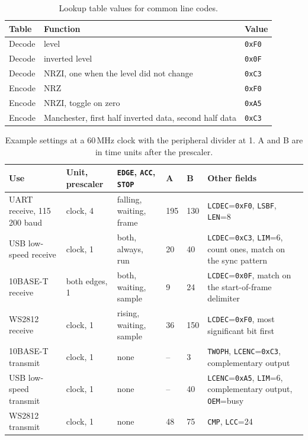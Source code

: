 \documentclass[10pt,a4paper]{article}
\newcommand{\reg}[1]{\texttt{#1}}
\begin{document}
\begin{table}[H]
\centering\small
\begin{tabular}{@{}lll@{}}
\toprule
Table & Function & Value \\
\midrule
Decode & level & \texttt{0xF0} \\
Decode & inverted level & \texttt{0x0F} \\
Decode & NRZI, one when the level did not change & \texttt{0xC3} \\
Encode & NRZ & \texttt{0xF0} \\
Encode & NRZI, toggle on zero & \texttt{0xA5} \\
Encode & Manchester, first half inverted data, second half data & \texttt{0xC3} \\
\bottomrule
\end{tabular}
\caption{Lookup table values for common line codes.}
\end{table}

\begin{table}[H]
\centering\small
\begin{tabularx}{\linewidth}{@{}lllllL@{}}
\toprule
Use & Unit, prescaler & \reg{EDGE}, \reg{ACC}, \reg{STOP} & A & B & Other fields \\
\midrule
UART receive, 115\,200 baud & clock, 4 & falling, waiting, frame & 195 & 130 & \reg{LCDEC}=\texttt{0xF0}, \reg{LSBF}, \reg{LEN}=8 \\
USB low-speed receive & clock, 1 & both, always, run & 20 & 40 & \reg{LCDEC}=\texttt{0xC3}, \reg{LIM}=6, count ones, match on the sync pattern \\
10BASE-T receive & both edges, 1 & both, waiting, sample & 9 & 24 & \reg{LCDEC}=\texttt{0x0F}, match on the start-of-frame delimiter \\
WS2812 receive & clock, 1 & rising, waiting, sample & 36 & 150 & \reg{LCDEC}=\texttt{0xF0}, most significant bit first \\
10BASE-T transmit & clock, 1 & none & -- & 3 & \reg{TWOPH}, \reg{LCENC}=\texttt{0xC3}, complementary output \\
USB low-speed transmit & clock, 1 & none & -- & 40 & \reg{LCENC}=\texttt{0xA5}, \reg{LIM}=6, complementary output, \reg{OEM}=busy \\
WS2812 transmit & clock, 1 & none & 48 & 75 & \reg{CMP}, \reg{LCC}=24 \\
\bottomrule
\end{tabularx}
\caption{Example settings at a 60\,MHz clock with the peripheral divider at 1. A and B are in time units after the prescaler.}
\end{table}
\end{document}
